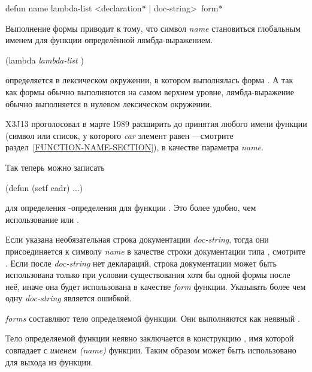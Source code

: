 \begin{defmac}
defun name lambda-list <{declaration}* | doc-string> {\,form}*

Выполнение формы  приводит к тому, что символ \emph{name}
становиться глобальным именем для функции определённой лямбда-выражением.
\begin{lisp}
(lambda \emph{lambda-list}  )
\end{lisp}
определяется в лексическом окружении, в котором выполнялась форма
. А так как формы  обычно выполняются на самом верхнем
уровне, лямбда-выражение обычно выполняется в нулевом лексическом окружении.

\begin{newer}
X3J13 проголосовал в марте 1989  расширить  до
принятия любого имени функции (символ или список, у которого \emph{car} элемент
равен ---смотрите раздел~\ref{FUNCTION-NAME-SECTION}), в качестве
параметра \emph{name}.

Так теперь можно записать
\begin{lisp}
(defun (setf cadr) ...)
\end{lisp}
для определения -определения для функции . Это более удобно,
чем использование  или .
\end{newer}

Если указана необязательная строка документации \emph{doc-string}, тогда они
присоединяется к символу \emph{name} в качестве строки документации типа
, смотрите . Если после \emph{doc-string} нет
деклараций, строка документации может быть использована только при условии
существования хотя бы одной формы после неё, иначе она будет использована в
качестве \emph{form} функции. Указывать более чем одну \emph{doc-string} является ошибкой.

\emph{forms} составляют тело определяемой функции. Они выполняются как неявный .

Тело определяемой функции неявно заключается в конструкцию , имя
которой совпадает с \emph{именем (name)} функции. Таким образом
 может быть использовано для выхода из функции.


\end{defmac}
